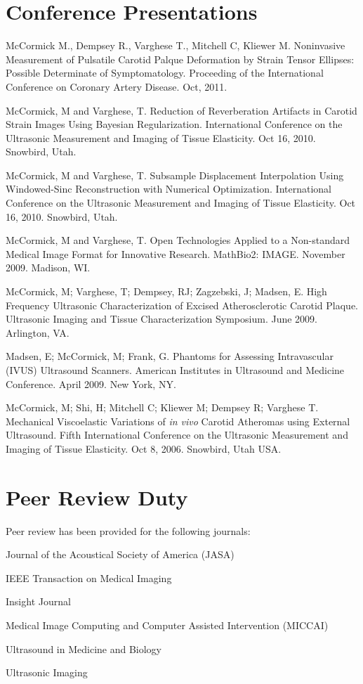 \documentclass[margin,line]{res}
\newenvironment{list1}{
  \begin{list}{\ding{113}}{%
      \setlength{\itemsep}{0in}
      \setlength{\parsep}{0in} \setlength{\parskip}{0in}
      \setlength{\topsep}{0in} \setlength{\partopsep}{0in} 
      \setlength{\leftmargin}{0.17in}}}{\end{list}}
\begin{document}
\begin{resume}
\section{\sc Conference Presentations}

McCormick M., Dempsey R., Varghese T., Mitchell C, Kliewer M.  Noninvasive
Measurement of Pulsatile Carotid Palque Deformation by Strain Tensor Ellipses:
Possible Determinate of Symptomatology.  Proceeding of the International
Conference on Coronary Artery Disease.  Oct, 2011.

McCormick, M and Varghese, T.  Reduction of Reverberation Artifacts in Carotid
Strain Images Using Bayesian Regularization.  International Conference on the
Ultrasonic Measurement and Imaging of Tissue Elasticity.  Oct 16, 2010.
Snowbird, Utah.

McCormick, M and Varghese, T.  Subsample Displacement Interpolation Using
Windowed-Sinc Reconstruction with Numerical Optimization.  International
Conference on the Ultrasonic Measurement and Imaging of Tissue Elasticity.  Oct
16, 2010.  Snowbird, Utah.

McCormick, M and Varghese, T.  Open Technologies Applied to a Non-standard Medical
Image Format for Innovative Research.  MathBio2: IMAGE.  November 2009.  Madison, WI.

McCormick, M; Varghese, T; Dempsey, RJ; Zagzebski, J; Madsen, E.  High Frequency Ultrasonic Characterization of Excised Atherosclerotic
Carotid Plaque.  Ultrasonic Imaging and Tissue Characterization
Symposium.  June 2009.  Arlington, VA.

Madsen, E;  McCormick, M;  Frank, G.  Phantoms for Assessing
Intravascular (IVUS) Ultrasound Scanners.  American Institutes in
Ultrasound and Medicine Conference.  April 2009.  New York, NY.

McCormick, M; Shi, H; Mitchell C; Kliewer M; Dempsey R; Varghese T.   Mechanical
Viscoelastic Variations of \textit{in vivo} Carotid Atheromas using External
Ultrasound.  Fifth International Conference on the Ultrasonic Measurement and
Imaging of Tissue Elasticity.  Oct 8, 2006.  Snowbird, Utah USA.


\section{\sc Peer Review Duty}

Peer review has been provided for the following journals:

\begin{list1}
\item[] Journal of the Acoustical Society of America (JASA)
\item[] IEEE Transaction on Medical Imaging
\item[] Insight Journal
\item[] Medical Image Computing and Computer Assisted Intervention (MICCAI)
\item[] Ultrasound in Medicine and Biology
\item[] Ultrasonic Imaging
\end{list1}


\end{resume}
\end{document}
